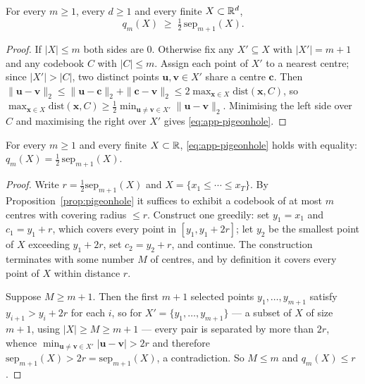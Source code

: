 \begin{proposition}
\label{prop:pigeonhole}
For every $m\ge1$, every $d\ge1$ and every finite $X\subset\mathbb{R}^d$,
\begin{equation}
  q_m(X)\;\ge\;\tfrac12\,\mathrm{sep}_{m+1}(X).
  \label{eq:app-pigeonhole}
\end{equation}
\end{proposition}

\begin{proof}
If $|X|\le m$ both sides are $0$. Otherwise fix any $X'\subseteq X$ with
$|X'|=m+1$ and any codebook $C$ with $|C|\le m$. Assign each point of $X'$ to a
nearest centre; since $|X'|>|C|$, two distinct points $\bm{u},\bm{v}\in X'$ share a
centre $\bm{c}$. Then
$\|\bm{u}-\bm{v}\|_2\le\|\bm{u}-\bm{c}\|_2+\|\bm{c}-\bm{v}\|_2\le2\max_{\bm{x}\in X}\mathrm{dist}(\bm{x},C)$,
so $\max_{\bm{x}\in X}\mathrm{dist}(\bm{x},C)\ge\tfrac12\min_{\bm{u}\neq\bm{v}\in X'}\|\bm{u}-\bm{v}\|_2$.
Minimising the left side over $C$ and maximising the right over $X'$ gives
\eqref{eq:app-pigeonhole}.
\end{proof}

\begin{proposition}[Tightness at $d=1$, every $m$]
\label{prop:pigeonhole-tight}
For every $m\ge1$ and every finite $X\subset\mathbb{R}$, \eqref{eq:app-pigeonhole} holds
with equality: $q_m(X)=\tfrac12\,\mathrm{sep}_{m+1}(X)$.
\end{proposition}

\begin{proof}
Write $r=\tfrac12\mathrm{sep}_{m+1}(X)$ and $X=\{x_1\le\cdots\le x_T\}$. By
Proposition~\ref{prop:pigeonhole} it suffices to exhibit a codebook of at most $m$
centres with covering radius $\le r$. Construct one greedily: set $y_1=x_1$ and
$c_1=y_1+r$, which covers every point in $[y_1,y_1+2r]$; let $y_2$ be the smallest
point of $X$ exceeding $y_1+2r$, set $c_2=y_2+r$, and continue. The construction
terminates with some number $M$ of centres, and by definition it covers every point
of $X$ within distance $r$.

Suppose $M\ge m+1$. Then the first $m+1$ selected points $y_1,\dots,y_{m+1}$ satisfy
$y_{i+1}>y_i+2r$ for each $i$, so for $X'=\{y_1,\dots,y_{m+1}\}$ --- a subset of $X$
of size $m+1$, using $|X|\ge M\ge m+1$ --- every pair is separated by more than
$2r$, whence $\min_{\bm{u}\neq\bm{v}\in X'}|\bm{u}-\bm{v}|>2r$ and therefore
$\mathrm{sep}_{m+1}(X)>2r=\mathrm{sep}_{m+1}(X)$, a contradiction. So $M\le m$ and
$q_m(X)\le r$.
\end{proof}

